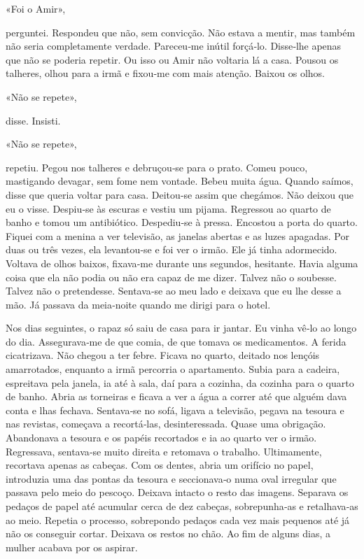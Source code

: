 «Foi o Amir»,

perguntei. Respondeu que não, sem convicção. Não estava a mentir, mas
também não seria completamente verdade. Pareceu­‑me inútil forçá­‑lo.
Disse­‑lhe apenas que não se poderia repetir. Ou isso ou Amir não
voltaria lá a casa. Pousou os talheres, olhou para a irmã e fixou­‑me
com mais atenção. Baixou os olhos.

«Não se repete»,

disse. Insisti.

«Não se repete»,

repetiu. Pegou nos talheres e debruçou­‑se para o prato. Comeu pouco,
mastigando devagar, sem fome nem vontade. Bebeu muita água. Quando
saímos, disse que queria voltar para casa. Deitou­‑se assim que
chegámos. Não deixou que eu o visse. Despiu­‑se às escuras e vestiu um
pijama. Regressou ao quarto de banho e tomou um antibiótico.
Despediu­‑se à pressa. Encostou a porta do quarto. Fiquei com a menina a
ver televisão, as janelas abertas e as luzes apagadas. Por duas ou três
vezes, ela levantou­‑se e foi ver o irmão. Ele já tinha adormecido.
Voltava de olhos baixos, fixava­‑me durante uns segundos, hesitante.
Havia alguma coisa que ela não podia ou não era capaz de me dizer.
Talvez não o soubesse. Talvez não o pretendesse. Sentava­‑se ao meu lado
e deixava que eu lhe desse a mão. Já passava da meia­‑noite quando me
dirigi para o hotel.

Nos dias seguintes, o rapaz só saiu de casa para ir jantar. Eu vinha
vê­‑lo ao longo do dia. Assegurava­‑me de que comia, de que tomava os
medicamentos. A ferida cicatrizava. Não chegou a ter febre. Ficava no
quarto, deitado nos lençóis amarrotados, enquanto a irmã percorria o
apartamento. Subia para a cadeira, espreitava pela janela, ia até à
sala, daí para a cozinha, da cozinha para o quarto de banho. Abria as
torneiras e ficava a ver a água a correr até que alguém dava conta e
lhas fechava. Sentava­‑se no sofá, ligava a televisão, pegava na tesoura
e nas revistas, começava a recortá­‑las, desinteressada. Quase uma
obrigação. Abandonava a tesoura e os papéis recortados e ia ao quarto
ver o irmão. Regressava, sentava­‑se muito direita e retomava o
trabalho. Ultimamente, recortava apenas as cabeças. Com os dentes, abria
um orifício no papel, introduzia uma das pontas da tesoura e
seccionava­‑o numa oval irregular que passava pelo meio do pescoço.
Deixava intacto o resto das imagens. Separava os pedaços de papel até
acumular cerca de dez cabeças, sobrepunha­‑as e retalhava­‑as ao meio.
Repetia o processo, sobrepondo pedaços cada vez mais pequenos até já não
os conseguir cortar. Deixava os restos no chão. Ao fim de alguns dias, a
mulher acabava por os aspirar.

